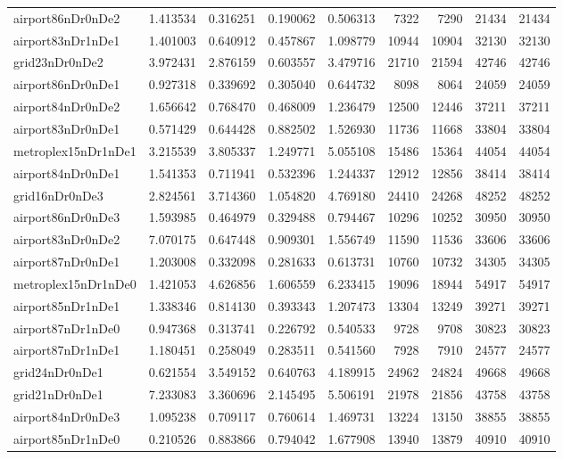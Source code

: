 \begin{longtable}{|l|r|r|r|r|r|r|r|r|}
airport86nDr0nDe2 & 1.413534 & 0.316251 & 0.190062 & 0.506313 & 7322 & 7290 & 21434 & 21434 \\
airport83nDr1nDe1 & 1.401003 & 0.640912 & 0.457867 & 1.098779 & 10944 & 10904 & 32130 & 32130 \\
grid23nDr0nDe2 & 3.972431 & 2.876159 & 0.603557 & 3.479716 & 21710 & 21594 & 42746 & 42746 \\
airport86nDr0nDe1 & 0.927318 & 0.339692 & 0.305040 & 0.644732 & 8098 & 8064 & 24059 & 24059 \\
airport84nDr0nDe2 & 1.656642 & 0.768470 & 0.468009 & 1.236479 & 12500 & 12446 & 37211 & 37211 \\
airport83nDr0nDe1 & 0.571429 & 0.644428 & 0.882502 & 1.526930 & 11736 & 11668 & 33804 & 33804 \\
metroplex15nDr1nDe1 & 3.215539 & 3.805337 & 1.249771 & 5.055108 & 15486 & 15364 & 44054 & 44054 \\
airport84nDr0nDe1 & 1.541353 & 0.711941 & 0.532396 & 1.244337 & 12912 & 12856 & 38414 & 38414 \\
grid16nDr0nDe3 & 2.824561 & 3.714360 & 1.054820 & 4.769180 & 24410 & 24268 & 48252 & 48252 \\
airport86nDr0nDe3 & 1.593985 & 0.464979 & 0.329488 & 0.794467 & 10296 & 10252 & 30950 & 30950 \\
airport83nDr0nDe2 & 7.070175 & 0.647448 & 0.909301 & 1.556749 & 11590 & 11536 & 33606 & 33606 \\
airport87nDr0nDe1 & 1.203008 & 0.332098 & 0.281633 & 0.613731 & 10760 & 10732 & 34305 & 34305 \\
metroplex15nDr1nDe0 & 1.421053 & 4.626856 & 1.606559 & 6.233415 & 19096 & 18944 & 54917 & 54917 \\
airport85nDr1nDe1 & 1.338346 & 0.814130 & 0.393343 & 1.207473 & 13304 & 13249 & 39271 & 39271 \\
airport87nDr1nDe0 & 0.947368 & 0.313741 & 0.226792 & 0.540533 & 9728 & 9708 & 30823 & 30823 \\
airport87nDr1nDe1 & 1.180451 & 0.258049 & 0.283511 & 0.541560 & 7928 & 7910 & 24577 & 24577 \\
grid24nDr0nDe1 & 0.621554 & 3.549152 & 0.640763 & 4.189915 & 24962 & 24824 & 49668 & 49668 \\
grid21nDr0nDe1 & 7.233083 & 3.360696 & 2.145495 & 5.506191 & 21978 & 21856 & 43758 & 43758 \\
airport84nDr0nDe3 & 1.095238 & 0.709117 & 0.760614 & 1.469731 & 13224 & 13150 & 38855 & 38855 \\
airport85nDr1nDe0 & 0.210526 & 0.883866 & 0.794042 & 1.677908 & 13940 & 13879 & 40910 & 40910 \\

\end{longtable}
